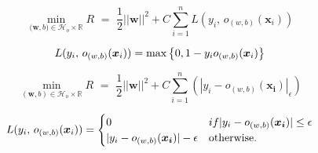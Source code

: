 \documentclass{article}
\newcommand{\set}[1]{{\left\{#1\right\}}}
\newcommand{\reals}{{\mathbb R}}
\begin{document}
\newpage

\begin{equation}
\label{eqn:reghingeloss}
\min\limits_{\bm (\bm{w},b) \in \mathcal{H}_o \times \reals} R {\,\,} = {\,\,} \frac{1}{2}||\bm{w}||^2 + C\sum_{i=1}^n L(y_i,\, o_{(w,b)}(\bm{x}_i))
\end{equation}

\begin{equation}\label{eqn:hingeloss}
\centering
L(y_i,\, o_{(w,b)}(\bm{x}_i)) = \max \set{0, 1 - y_i o_{(w,b)}(\bm{x}_i)}
\end{equation}

\begin{equation}
\label{eq:regsvmemp}
\min\limits_{(\bm{w},b) \in \mathcal{H}_o \times \reals} R {\,\,} = {\,\,} \frac{1}{2}||\bm{w}||^2 + C\sum_{i=1}^n (|y_i - o_{(w,b)}(\bm{x_i})|_\epsilon)
\end{equation}

\begin{equation}
\label{eq:epsloss}
\centering
L(y_i,\, o_{(w,b)}(\bm{x}_i)) = \begin{cases} 
															0 & if |y_i - o_{(w,b)}(\bm{x_i})| \leq \epsilon \\
															|y_i - o_{(w,b)}(\bm{x_i})| - \epsilon & \text{otherwise}.
														\end{cases}
\end{equation}
\end{document}
